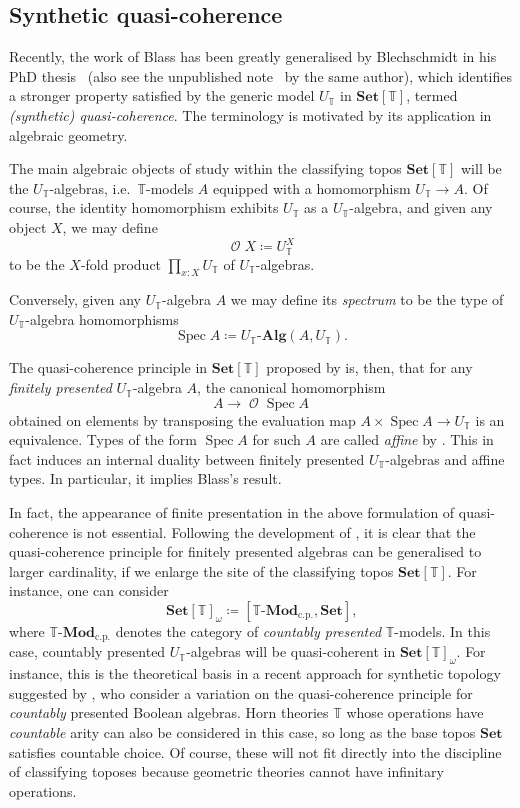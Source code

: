 \documentclass[a4paper,12pt]{amsart}
\theoremstyle{definition}
\newcommand{\mc}[1]{\mathcal{#1}}
\newcommand{\mb}[1]{\mathbf{#1}}
\newcommand{\mbb}[1]{\mathbb{#1}}
\newcommand{\T}{\mbb T}
\newcommand{\mr}[1]{\mathrm{#1}}
\newcommand{\Set}{\mb{Set}}
\newcommand{\alg}{\text{-}\mb{Alg}}
\newcommand{\cp}{_{\mr{c.p.}}}
\newcommand{\mmod}[1]{#1\text{-}\mathbf{Mod}}
\newcommand{\spec}{\operatorname{Spec}}
\newcommand{\opens}{\operatorname{\mc{O}}} %
\begin{document}
\subsection{Synthetic quasi-coherence}\label{subsec:qc}

Recently, the work of Blass has been greatly generalised by Blechschmidt in his PhD thesis~\citep{blechschmidt2021using} (also see the unpublished note~\citep{blechschmidt2020general} by the same author), which identifies a stronger property satisfied by the generic model $U_\T$ in $\Set[\T]$, termed \emph{(synthetic) quasi-coherence}. The terminology is motivated by its application in algebraic geometry.

The main algebraic objects of study within the classifying topos $\Set[\T]$ will be the $U_\T$-algebras, i.e.\ $\T$-models $A$ equipped with a homomorphism $U_\T\to A$. Of course, the identity homomorphism exhibits $U_\T$ as a $U_\T$-algebra, and given any object $X$, we may define \[\opens X\coloneq U_\T^X\] to be the $X$-fold product $\prod_{x:X}U_\T$ of $U_\T$-algebras. 

Conversely, given any $U_\T$-algebra $A$ we may define its \emph{spectrum} to be the type of $U_\T$-algebra homomorphisms 
\[ \spec A \coloneq U_\T\alg(A,U_\T)\text{.}\]

The quasi-coherence principle in $\Set[\T]$ proposed by \citet{blechschmidt2021using} is, then, that for any \emph{finitely presented} $U_\T$-algebra $A$, the canonical homomorphism
\[
  A\to \opens\spec A
\]
obtained on elements by transposing the evaluation map $A\times \spec A\to U_\T$ is an equivalence.
Types of the form $\spec A$ for such $A$ are called \emph{affine} by \citet{blechschmidt2021using}. This in fact induces an internal duality between finitely presented $U_\T$-algebras and affine types. In particular, it implies Blass's result. 

In fact, the appearance of finite presentation in the above formulation of quasi-coherence is not essential. Following the development of \citet{blechschmidt2021using,blechschmidt2020general}, it is clear that the quasi-coherence principle for finitely presented algebras can be generalised to larger cardinality,
if we enlarge the site of the classifying topos $\Set[\T]$. For instance, one can consider
\[ \Set[\T]_\omega \coloneq [\mmod\T\cp,\Set]\text{,} \]
where $\mmod\T\cp$ denotes the category of \emph{countably presented}  $\T$-models. In this case, countably presented $U_\T$-algebras will be quasi-coherent in $\Set[\T]_\omega$. For instance, this is the theoretical basis in a recent approach for synthetic topology suggested by \citet{cherubini2024foundation}, who consider a variation on the quasi-coherence principle for \emph{countably} presented Boolean algebras. 
%
Horn theories $\T$ whose operations have \emph{countable} arity can also be considered in this case, so long as the base topos $\Set$ satisfies countable choice. Of course, these will not fit directly into the discipline of classifying toposes because geometric theories cannot have infinitary operations.
\end{document}
